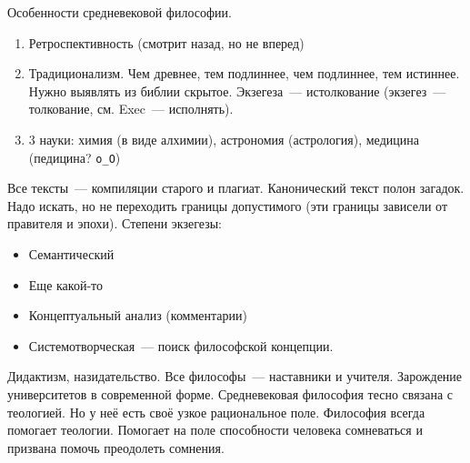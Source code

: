 Особенности средневековой философии.
\begin{enumerate}
	\item Ретроспективность (смотрит назад, но не вперед) 
	\item Традиционализм. Чем древнее, тем подлиннее, чем подлиннее, тем истиннее. Нужно выявлять из библии скрытое. Экзегеза~--- истолкование (экзегез~--- толкование, см. Exec~--- исполнять). 
	\item 3 науки: химия (в виде алхимии), астрономия (астрология), медицина (педицина? \texttt{o\_O}) 
\end{enumerate}
Все тексты~--- компиляции старого и плагиат.
Канонический текст полон загадок. Надо искать, но не переходить границы допустимого (эти границы зависели от правителя и эпохи). 
Степени экзегезы:

\begin{itemize}
	\item Семантический
	\item Еще какой-то
	\item Концептуальный анализ (комментарии) 
	\item Системотворческая~--- поиск философской концепции.
\end{itemize}
Дидактизм, назидательство. Все философы~--- наставники и учителя. Зарождение университетов в современной форме.
Средневековая философия тесно связана с теологией. Но у неё есть своё узкое рациональное поле. Философия всегда помогает теологии. Помогает на поле способности человека сомневаться и призвана помочь преодолеть сомнения.
